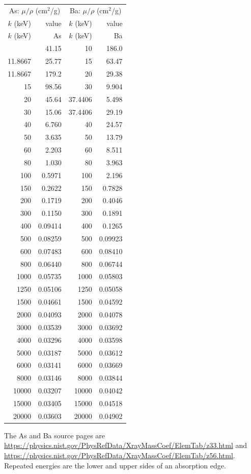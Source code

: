 \documentclass[10pt,a4paper]{article}
\begin{document}
\small
\begin{longtable}{rr@{\hspace{14mm}}rr}
\toprule
\multicolumn{2}{c}{As: $\mu/\rho$ (cm$^2$/g)}&\multicolumn{2}{c}{Ba: $\mu/\rho$ (cm$^2$/g)}\\
$k$ (keV)&value&$k$ (keV)&value\\\midrule\endfirsthead
\toprule $k$ (keV)&As&$k$ (keV)&Ba\\\midrule\endhead
\bottomrule\endfoot
10&41.15&10&186.0\\
11.8667&25.77&15&63.47\\
11.8667&179.2&20&29.38\\
15&98.56&30&9.904\\
20&45.64&37.4406&5.498\\
30&15.06&37.4406&29.19\\
40&6.760&40&24.57\\
50&3.635&50&13.79\\
60&2.203&60&8.511\\
80&1.030&80&3.963\\
100&0.5971&100&2.196\\
150&0.2622&150&0.7828\\
200&0.1719&200&0.4046\\
300&0.1150&300&0.1891\\
400&0.09414&400&0.1265\\
500&0.08259&500&0.09923\\
600&0.07483&600&0.08410\\
800&0.06440&800&0.06744\\
1000&0.05735&1000&0.05803\\
1250&0.05106&1250&0.05058\\
1500&0.04661&1500&0.04592\\
2000&0.04093&2000&0.04078\\
3000&0.03539&3000&0.03692\\
4000&0.03296&4000&0.03598\\
5000&0.03187&5000&0.03612\\
6000&0.03141&6000&0.03669\\
8000&0.03146&8000&0.03844\\
10000&0.03207&10000&0.04042\\
15000&0.03405&15000&0.04518\\
20000&0.03603&20000&0.04902\\
\end{longtable}
\normalsize
The As and Ba source pages are \url{https://physics.nist.gov/PhysRefData/XrayMassCoef/ElemTab/z33.html} and \url{https://physics.nist.gov/PhysRefData/XrayMassCoef/ElemTab/z56.html}. Repeated energies are the lower and upper sides of an absorption edge.
\end{document}

